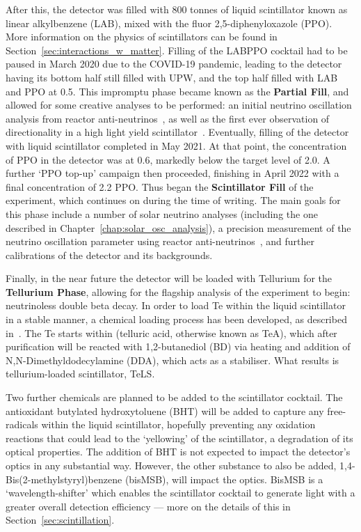 After this, the detector was filled with 800 tonnes of liquid scintillator known as linear alkylbenzene (LAB), mixed with the fluor 2,5-diphenyloxazole (PPO). More information on the physics of scintillators can be found in Section~\ref{sec:interactions_w_matter}. Filling of the LABPPO cocktail had to be paused in March 2020 due to the COVID-19 pandemic, leading to the detector having its bottom half still filled with UPW, and the top half filled with LAB and PPO at \SI{0.5}{\gpl}. This impromptu phase became known as the \textbf{Partial Fill}, and allowed for some creative analyses to be performed: an initial neutrino oscillation analysis from reactor anti-neutrinos~\cite{morton-blakeFirstMeasurementReactor2021}, %
as well as the first ever observation of directionality in a high light yield scintillator~\cite{}. %
Eventually, filling of the detector with liquid scintillator completed in May 2021. At that point, the concentration of PPO in the detector was at \SI{0.6}{\gpl}, markedly below the target level of \SI{2.0}{\gpl}. A further `PPO top-up' campaign then proceeded, finishing in April 2022 with a final concentration of \SI{2.2}{\gpl} PPO. Thus began the \textbf{Scintillator Fill} of the experiment, which continues on during the time of writing. The main goals for this phase include a number of solar neutrino analyses (including the one described in Chapter~\ref{chap:solar_osc_analysis}), a precision measurement of the neutrino oscillation parameter \dmsq{} using reactor anti-neutrinos~\cite{morton-blakeFirstMeasurementReactor2021}, %
and further calibrations of the detector and its backgrounds.

Finally, in the near future the detector will be loaded with Tellurium for the \textbf{Tellurium Phase}, allowing for the flagship analysis of the experiment to begin: neutrinoless double beta decay. In order to load Te within the liquid scintillator in a stable manner, a chemical loading process has been developed, as described in~\cite{autyMethodLoadTellurium2023}. %
The Te starts within  (telluric acid, otherwise known as TeA), which after purification will be reacted with 1,2-butanediol (BD) via heating and addition of N,N-Dimethyldodecylamine (DDA), which acts as a stabiliser. What results is tellurium-loaded scintillator, TeLS.

Two further chemicals are planned to be added to the scintillator cocktail. The antioxidant butylated hydroxytoluene (BHT) will be added to capture any free-radicals within the liquid scintillator, hopefully preventing any oxidation reactions that could lead to the `yellowing' of the scintillator, a degradation of its optical properties. The addition of BHT is not expected to impact the detector's optics in any substantial way. However, the other substance to also be added, 1,4-Bis(2-methylstyryl)benzene (bisMSB), will impact the optics. BisMSB is a `wavelength-shifter' which enables the scintillator cocktail to generate light with a greater overall detection efficiency --- more on the details of this in Section~\ref{sec:scintillation}.

